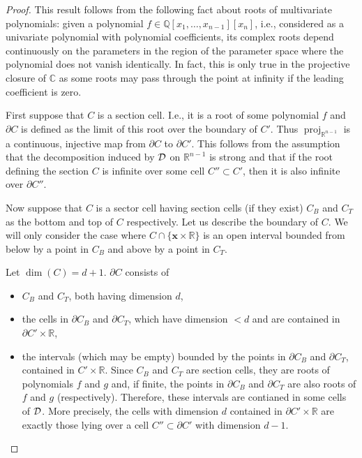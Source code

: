 \documentclass[
]{book}
\providecommand{\tightlist}{%
  \setlength{\itemsep}{0pt}\setlength{\parskip}{0pt}}
\theoremstyle{definition}
\theoremstyle{definition}
\theoremstyle{definition}
\theoremstyle{definition}
\theoremstyle{remark}
\begin{document}
\begin{proof}
This result follows from the following fact about roots of multivariate polynomials: given a polynomial \(f \in \mathbb{Q}[x_1,\ldots,x_{n-1}][x_n]\), i.e., considered as a univariate polynomial with polynomial coefficients, its complex roots depend continuously on the parameters in the region of the parameter space where the polynomial does not vanish identically. In fact, this is only true in the projective closure of \(\mathbb{C}\) as some roots may pass through the point at infinity if the leading coefficient is zero.

First suppose that \(C\) is a section cell. I.e., it is a root of some polynomial \(f\) and \(\partial C\) is defined as the limit of this root over the boundary of \(C'\). Thus \({\operatorname{proj}_{\mathbb{R}^{n-1}}}\) is a continuous, injective map from \(\partial C\) to \(\partial C'\). This follows from the assumption that the decomposition induced by \(\cal D\) on \(\mathbb{R}^{n-1}\) is strong and that if the root defining the section \(C\) is infinite over some cell \(C'' \subset C'\), then it is also infinite over \(\partial C''\).

Now suppose that \(C\) is a sector cell having section cells (if they exist) \(C_B\) and \(C_T\) as the bottom and top of \(C\) respectively. Let us describe the boundary of \(C\). We will only consider the case where \(C \cap \{ \mathbf{x} \times \mathbb{R}\}\) is an open interval bounded from below by a point in \(C_B\) and above by a point in \(C_T\).

Let \(\dim(C) = d + 1\). \(\partial C\) consists of

\begin{itemize}
\tightlist
\item
  \(C_B\) and \(C_T\), both having dimension \(d\),
\item
  the cells in \(\partial C_B\) and \(\partial C_T\), which have dimension \(< d\) and are contained in \(\partial C' \times \mathbb{R}\),
\item
  the intervals (which may be empty) bounded by the points in \(\partial C_B\) and \(\partial C_T\), contained in \(C' \times \mathbb{R}\). Since \(C_B\) and \(C_T\) are section cells, they are roots of polynomials \(f\) and \(g\) and, if finite, the points in \(\partial C_B\) and \(\partial C_T\) are also roots of \(f\) and \(g\) (respectively). Therefore, these intervals are contianed in some cells of \(\cal D\). More precisely, the cells with dimension \(d\) contained in \(\partial C' \times \mathbb{R}\) are exactly those lying over a cell \(C'' \subset \partial C'\) with dimension \(d-1\).
\end{itemize}


\end{proof}
\end{document}
